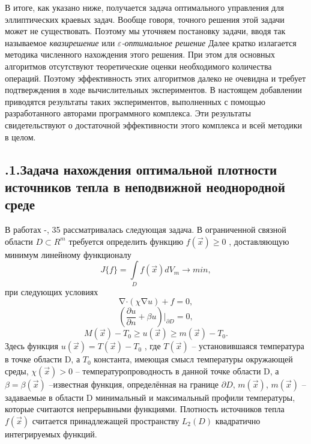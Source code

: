 В итоге, как указано ниже, получается задача оптимального управления для эллиптических краевых задач. Вообще говоря, точного решения этой задачи может не существовать. Поэтому мы уточняем постановку задачи, вводя так называемое \textit{квазирешение} или
 \textit{$\varepsilon$-оптимальное решение}
Далее кратко излагается методика численного нахождения этого решения. При этом для основных алгоритмов отсутствуют теоретические оценки необходимого количества операций. Поэтому эффективность этих алгоритмов далеко не очевидна и требует подтверждения в ходе вычислительных экспериментов. В настоящем добавлении приводятся результаты таких экспериментов, выполненных с помощью разработанного авторами программного комплекса. Эти результаты свидетельствуют о достаточной эффективности этого комплекса и всей методики в целом.
\subsection*{ .1.Задача нахождения оптимальной плотности источников тепла в неподвижной неоднородной среде}

В работах \cite{literature_brusencev_2010}-\cite{literature_brusencev_2016}, 35 рассматривалась следующая задача. В ограниченной связной области $D{\subset} R^m$ требуется определить функцию $f(\vec x){\geq} 0$  , доставляющую минимум линейному функционалу
 			  \begin{equation} \label{equation_9_1}
              J\{f\}=\int\limits_D  f(\vec x)dV_m \to min,
              \end{equation}
при следующих условиях\[\mathop{\nabla} \cdot (\chi\mathop{\nabla}u)+ f=0,\]
              \begin{equation} \label{equation_9_2}
              (\frac{\partial u}{\partial n}+ \beta u)|_{\partial D}=0,
              \end{equation}
              \begin{equation} \label{equation_9_3}
              M(\vec x)-T_0\ge u(\vec x)\ge m(\vec x)-T_0.
              \end{equation}
Здесь функция $u(\vec x)=T(\vec x)-T_0$  , где  $T(\vec x)$  -- установившаяся температура в точке   области D, а  $T_0$ константа, имеющая смысл температуры окружающей среды,   $\chi(\vec x)>0$ -- температуропроводность в данной точке области D, а  $\beta=\beta(\vec x)$ --известная функция, определённая на границе $\partial D$, $m(\vec x)$,  $m(\vec x)$ --задаваемые в области D минимальный и максимальный профили температуры, которые считаются непрерывными функциями. Плотность источников тепла  $f(\vec x)$ считается принадлежащей пространству $L_2(D)$ квадратично интегрируемых функций.

